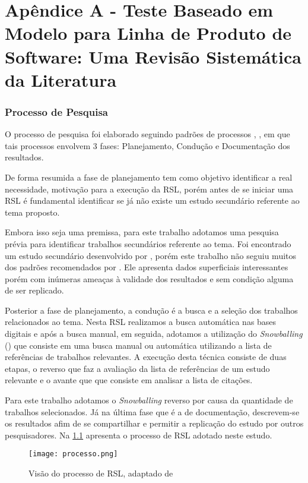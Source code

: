 \chapter{Apêndice A - Teste Baseado em Modelo para Linha de Produto de Software: Uma Revisão Sistemática da Literatura}
\label{sec:apendice}


\subsection{Processo de Pesquisa}
O processo de pesquisa foi elaborado seguindo padrões de processos \cite{kitchenham2004procedures}, \cite{nakagawa2017revisao}, \cite{keele2007guidelines} em que tais processos envolvem 3 fases: Planejamento, Condução e Documentação dos resultados.

De forma resumida a fase de planejamento tem como objetivo identificar a real necessidade, motivação para a execução da RSL, porém antes de se iniciar uma RSL é fundamental identificar se já não existe um estudo secundário referente ao tema proposto.

Embora isso seja uma premissa, para este trabalho adotamos uma pesquisa prévia para identificar trabalhos secundários referente ao tema. Foi encontrado um estudo secundário desenvolvido por \cite{isa2017model}, porém este trabalho não seguiu muitos dos padrões recomendados por \cite{kitchenham2004procedures}. Ele apresenta dados superficiais interessantes porém com inúmeras ameaças à validade dos resultados e sem condição alguma de ser replicado.

Posterior a fase de planejamento, a condução é a busca e a seleção dos trabalhos relacionados ao tema. Nesta RSL realizamos a busca automática nas bases digitais e após a busca manual, em seguida, adotamos a utilização do \textit{Snowballing} (\citealp{wohlin2014guidelines}) que consiste em uma busca manual ou automática utilizando a lista de referências de trabalhos relevantes. A execução desta técnica consiste de duas etapas, o reverso que faz a avaliação da lista de referências de um estudo relevante e o avante que que consiste em analisar a lista de citações.

Para este trabalho adotamos o \textit{Snowballing} reverso por causa da quantidade de trabalhos selecionados. Já na última fase que é a de documentação, descrevem-se os resultados afim de se compartilhar e permitir a replicação do estudo por outros pesquisadores. Na \ref{fig:processo} apresenta o processo de RSL adotado neste estudo.

\newpage
\begin{figure}[htb]
	\centering
	\caption{Visão do processo de RSL, adaptado de \cite{nakagawa2017revisao}}
	\texttt{[image: processo.png]}
	\label{fig:processo}
\end{figure}

